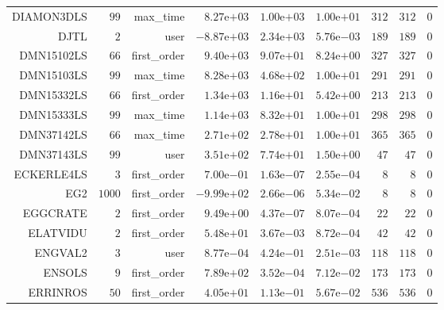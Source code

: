 \begin{longtable}{rrrrrrrrr}
DIAMON3DLS & \(    99\) & max\_time & \( 8.27\)e\(+03\) & \( 1.00\)e\(+03\) & \( 1.00\)e\(+01\) & \(   312\) & \(   312\) & \(     0\) \\
DJTL & \(     2\) & user & \(-8.87\)e\(+03\) & \( 2.34\)e\(+03\) & \( 5.76\)e\(-03\) & \(   189\) & \(   189\) & \(     0\) \\
DMN15102LS & \(    66\) & first\_order & \( 9.40\)e\(+03\) & \( 9.07\)e\(+01\) & \( 8.24\)e\(+00\) & \(   327\) & \(   327\) & \(     0\) \\
DMN15103LS & \(    99\) & max\_time & \( 8.28\)e\(+03\) & \( 4.68\)e\(+02\) & \( 1.00\)e\(+01\) & \(   291\) & \(   291\) & \(     0\) \\
DMN15332LS & \(    66\) & first\_order & \( 1.34\)e\(+03\) & \( 1.16\)e\(+01\) & \( 5.42\)e\(+00\) & \(   213\) & \(   213\) & \(     0\) \\
DMN15333LS & \(    99\) & max\_time & \( 1.14\)e\(+03\) & \( 8.32\)e\(+01\) & \( 1.00\)e\(+01\) & \(   298\) & \(   298\) & \(     0\) \\
DMN37142LS & \(    66\) & max\_time & \( 2.71\)e\(+02\) & \( 2.78\)e\(+01\) & \( 1.00\)e\(+01\) & \(   365\) & \(   365\) & \(     0\) \\
DMN37143LS & \(    99\) & user & \( 3.51\)e\(+02\) & \( 7.74\)e\(+01\) & \( 1.50\)e\(+00\) & \(    47\) & \(    47\) & \(     0\) \\
ECKERLE4LS & \(     3\) & first\_order & \( 7.00\)e\(-01\) & \( 1.63\)e\(-07\) & \( 2.55\)e\(-04\) & \(     8\) & \(     8\) & \(     0\) \\
EG2 & \(  1000\) & first\_order & \(-9.99\)e\(+02\) & \( 2.66\)e\(-06\) & \( 5.34\)e\(-02\) & \(     8\) & \(     8\) & \(     0\) \\
EGGCRATE & \(     2\) & first\_order & \( 9.49\)e\(+00\) & \( 4.37\)e\(-07\) & \( 8.07\)e\(-04\) & \(    22\) & \(    22\) & \(     0\) \\
ELATVIDU & \(     2\) & first\_order & \( 5.48\)e\(+01\) & \( 3.67\)e\(-03\) & \( 8.72\)e\(-04\) & \(    42\) & \(    42\) & \(     0\) \\
ENGVAL2 & \(     3\) & user & \( 8.77\)e\(-04\) & \( 4.24\)e\(-01\) & \( 2.51\)e\(-03\) & \(   118\) & \(   118\) & \(     0\) \\
ENSOLS & \(     9\) & first\_order & \( 7.89\)e\(+02\) & \( 3.52\)e\(-04\) & \( 7.12\)e\(-02\) & \(   173\) & \(   173\) & \(     0\) \\
ERRINROS & \(    50\) & first\_order & \( 4.05\)e\(+01\) & \( 1.13\)e\(-01\) & \( 5.67\)e\(-02\) & \(   536\) & \(   536\) & \(     0\) \\

\end{longtable}
